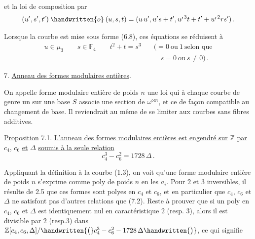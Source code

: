 %
%
et la loi de composition par
\[
(u',s',t')\mathbin{\handwritten{o}}(u,s,t)
=(u\,u',u's+t',u^{\raisebox{-.38ex}{$\scriptstyle\prime$}\,3}t+t'+u^{\raisebox{-.38ex}{$\scriptstyle\prime$}\,2}rs')\, .
\]

Lorsque la courbe est mise sous forme (6.8), ces équations se réduisent à
\[
\begin{aligned}
u\in\mu_3 \qquad s\in\mathbb{F}_4 \qquad t^2+t=s^3
 &\quad ({}=0\ \text{ou}\ 1\ \text{selon que}\\
 &\qquad s=0\ \text{ou}\ s\ne 0) \, .
\end{aligned}
\]

7. \quad \uline{Anneau des formes modulaires entières}.

On appelle forme modulaire entière de poids $n$ une loi qui à chaque courbe de genre un sur une base $S$ associe une section de $\omega^{\otimes n}$, et ce de façon compatible au changement de base. Il reviendrait au même de se limiter aux courbes sans fibres additives.

\uline{Proposition} 7.1. \quad \uline{L'anneau des formes modulaires entières est engendré sur} $\mathbb{Z}$ \uline{par} $c_4$, $c_6$ \uline{et} $\Delta$ \uline{soumis à la seule relation}
\[
c_4^3-c_6^2=1728\,\Delta \, . \tag*{(7.2.)}
\]

Appliquant la définition à la courbe (1.3), on voit qu'une forme modulaire entière de poids $n$ s'exprime comme poly de poids $n$ en les $a_i$. Pour $2$ et $3$ inversibles, il résulte de 2.5 que ces formes sont  polyes en $c_4$ et $c_6$, et en particulier que $c_4$, $c_6$ et $\Delta$ ne satisfont pas d'autres relations que (7.2). Reste à prouver que si un poly en $c_4$, $c_6$ et $\Delta$ est identiquement nul en caractéristique $2$ (resp. $3$), alors il est divisible par $2$ (resp.$3$) dans $\mathbb{Z}[c_4,c_6,\Delta]/\handwritten{\bigl(}c_4^3-c_6^2-1728\,\Delta\handwritten{\bigr)}$, ce qui signifie%

